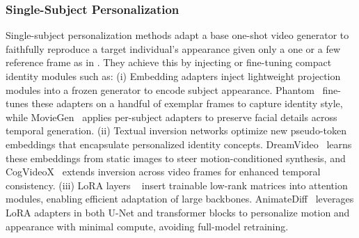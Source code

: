 \subsubsection{Single-Subject Personalization}
\label{sec:arch-single}
Single-subject personalization methods adapt a base one-shot video generator to faithfully reproduce a target individual’s appearance given only a one or a few reference frame as in \cite{liu2025phantom,polyak2024moviegen,gao2023dreamvideo,gu2023animatediff,yang2024cogvideox}. They achieve this by injecting or fine-tuning compact identity modules such as: (i) Embedding adapters inject lightweight projection modules into a frozen generator to encode subject appearance. Phantom~\cite{liu2025phantom} fine-tunes these adapters on a handful of exemplar frames to capture identity style, while MovieGen~\cite{polyak2024moviegen} applies per-subject adapters to preserve facial details across temporal generation. (ii) Textual inversion networks optimize new pseudo-token embeddings that encapsulate personalized identity concepts. DreamVideo~\cite{gao2023dreamvideo} learns these embeddings from static images to steer motion-conditioned synthesis, and CogVideoX~\cite{yang2024cogvideox} extends inversion across video frames for enhanced temporal consistency. (iii) LoRA layers ~\cite{hu2021lora} insert trainable low-rank matrices into attention modules, enabling efficient adaptation of large backbones. AnimateDiff~\cite{gu2023animatediff} leverages LoRA adapters in both U-Net and transformer blocks to personalize motion and appearance with minimal compute, avoiding full-model retraining.


